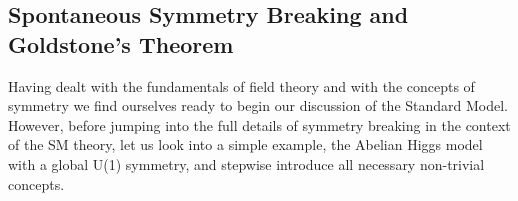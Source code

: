 \documentclass[12pt]{article}
\begin{document}
\subsection{Spontaneous Symmetry Breaking and Goldstone's Theorem} \label{SSBsection}

Having dealt with the fundamentals of field theory and with the concepts of symmetry we find ourselves ready to begin our discussion of the Standard Model. 
%	
However, before jumping into the full details of symmetry breaking in the context of the SM theory, let us look into a simple example, the Abelian Higgs model with a global U(1) symmetry, and stepwise introduce all necessary non-trivial concepts.





\end{document}
